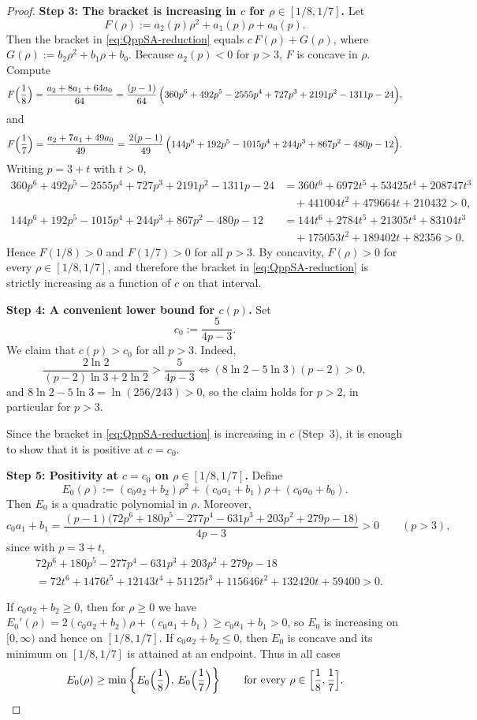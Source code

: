 \documentclass[11pt]{article}
\theoremstyle{definition}
\newcommand{\1}{\mathbf{1}}
\begin{document}
\begin{proof}
\medskip
\noindent\textbf{Step 3: The bracket is increasing in $c$ for $\rho\in[1/8,1/7]$.}
Let
\[
F(\rho):=a_2(p)\rho^2+a_1(p)\rho+a_0(p).
\]
Then the bracket in \eqref{eq:QppSA-reduction} equals $c\,F(\rho)+G(\rho)$, where $G(\rho):=b_2\rho^2+b_1\rho+b_0$.
Because $a_2(p)<0$ for $p>3$, $F$ is concave in $\rho$.
Compute
\[
F\Bigl(\frac18\Bigr)=\frac{a_2+8a_1+64a_0}{64}
=\frac{(p-1)}{64}\,\Bigl(360p^6+492p^5-2555p^4+727p^3+2191p^2-1311p-24\Bigr),
\]
and
\[
F\Bigl(\frac17\Bigr)=\frac{a_2+7a_1+49a_0}{49}
=\frac{2(p-1)}{49}\,\Bigl(144p^6+192p^5-1015p^4+244p^3+867p^2-480p-12\Bigr).
\]
Writing $p=3+t$ with $t>0$,
\begin{align*}
360p^6+492p^5-2555p^4+727p^3+2191p^2-1311p-24
&=360t^6+6972t^5+53425t^4+208747t^3\\
&\quad+441004t^2+479664t+210432>0,\\
144p^6+192p^5-1015p^4+244p^3+867p^2-480p-12
&=144t^6+2784t^5+21305t^4+83104t^3\\
&\quad+175053t^2+189402t+82356>0.
\end{align*}
Hence $F(1/8)>0$ and $F(1/7)>0$ for all $p>3$.
By concavity, $F(\rho)>0$ for every $\rho\in[1/8,1/7]$, and therefore the bracket in
\eqref{eq:QppSA-reduction} is strictly increasing as a function of $c$ on that interval.

\medskip
\noindent\textbf{Step 4: A convenient lower bound for $c(p)$.}
Set
\[
c_0:=\frac{5}{4p-3}.
\]
We claim that $c(p)>c_0$ for all $p>3$.
Indeed,
\[
\frac{2\ln2}{(p-2)\ln3+2\ln2}>\frac{5}{4p-3}
\iff
(8\ln2-5\ln3)(p-2)>0,
\]
and $8\ln2-5\ln3=\ln(256/243)>0$, so the claim holds for $p>2$, in particular for $p>3$.

Since the bracket in \eqref{eq:QppSA-reduction} is increasing in $c$ (Step~3), it is enough to show
that it is positive at $c=c_0$.

\medskip
\noindent\textbf{Step 5: Positivity at $c=c_0$ on $\rho\in[1/8,1/7]$.}
Define
\[
E_0(\rho):=(c_0a_2+b_2)\rho^2+(c_0a_1+b_1)\rho+(c_0a_0+b_0).
\]
Then $E_0$ is a quadratic polynomial in $\rho$.
Moreover,
\[
c_0a_1+b_1=\frac{(p-1)\bigl(72p^6+180p^5-277p^4-631p^3+203p^2+279p-18\bigr)}{4p-3}>0
\qquad (p>3),
\]
since with $p=3+t$,
\begin{align*}
&72p^6+180p^5-277p^4-631p^3+203p^2+279p-18\\
&=72t^6+1476t^5+12143t^4+51125t^3+115646t^2+132420t+59400>0.
\end{align*}

If $c_0a_2+b_2\ge 0$, then for $\rho\ge 0$ we have $E_0'(\rho)=2(c_0a_2+b_2)\rho+(c_0a_1+b_1)\ge c_0a_1+b_1>0$,
so $E_0$ is increasing on $[0,\infty)$ and hence on $[1/8,1/7]$.
If $c_0a_2+b_2\le 0$, then $E_0$ is concave and its minimum on $[1/8,1/7]$ is attained at an endpoint.
Thus in all cases
\[
E_0(\rho)\ge \min\left\{E_0\Bigl(\frac18\Bigr),\,E_0\Bigl(\frac17\Bigr)\right\}
\qquad\text{for every }\rho\in\Bigl[\frac18,\frac17\Bigr].
\]


\end{proof}
\end{document}

